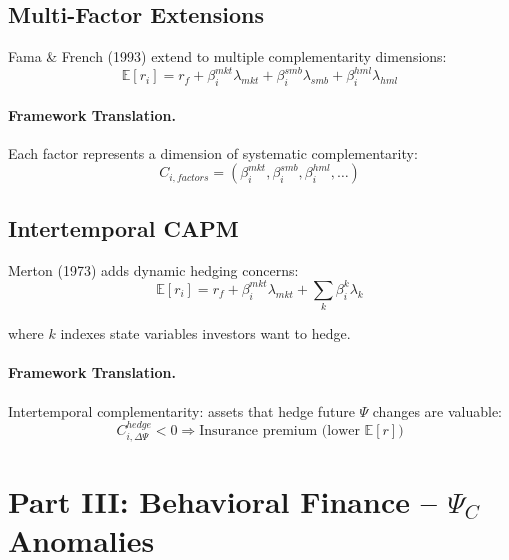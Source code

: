 \subsection{Multi-Factor Extensions}

Fama \& French (1993) extend to multiple complementarity dimensions:
\begin{equation}
\mathbb{E}[r_i] = r_f + \beta_i^{mkt} \lambda_{mkt} + \beta_i^{smb} \lambda_{smb} + \beta_i^{hml} \lambda_{hml}
\end{equation}

\paragraph{Framework Translation.}
Each factor represents a dimension of systematic complementarity:
\begin{equation}
C_{i,factors} = (\beta_i^{mkt}, \beta_i^{smb}, \beta_i^{hml}, \ldots)
\end{equation}

\subsection{Intertemporal CAPM}

Merton (1973) adds dynamic hedging concerns:
\begin{equation}
\mathbb{E}[r_i] = r_f + \beta_i^{mkt} \lambda_{mkt} + \sum_k \beta_i^{k} \lambda_k
\end{equation}

where $k$ indexes state variables investors want to hedge.

\paragraph{Framework Translation.}
Intertemporal complementarity: assets that hedge future $\Psi$ changes are valuable:
\begin{equation}
C_{i, \Delta\Psi}^{hedge} < 0 \Rightarrow \text{Insurance premium (lower } \mathbb{E}[r])
\end{equation}


\section{Part III: Behavioral Finance -- $\Psi_C$ Anomalies}
\label{sec:Y-behavioral}

